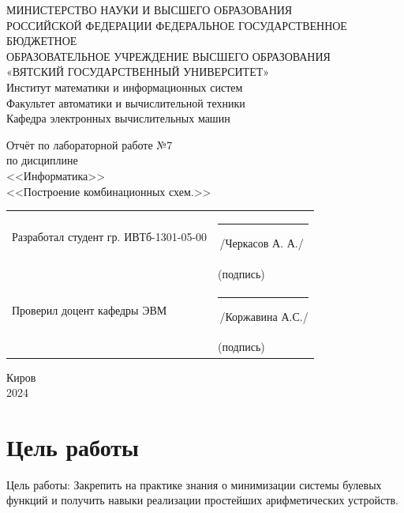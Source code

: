 \documentclass[oneside,a4paper,14pt]{extarticle}
\begin{document}
\newpage
\thispagestyle{empty}
\begin{center}
	МИНИСТЕРСТВО НАУКИ И ВЫСШЕГО ОБРАЗОВАНИЯ\\
	РОССИЙСКОЙ ФЕДЕРАЦИИ
	ФЕДЕРАЛЬНОЕ ГОСУДАРСТВЕННОЕ БЮДЖЕТНОЕ\\
	ОБРАЗОВАТЕЛЬНОЕ
	УЧРЕЖДЕНИЕ ВЫСШЕГО ОБРАЗОВАНИЯ\\
	«ВЯТСКИЙ ГОСУДАРСТВЕННЫЙ УНИВЕРСИТЕТ»\\
	Институт математики и информационных систем\\
	Факультет автоматики и вычислительной техники\\
	Кафедра электронных вычислительных машин
\end{center}
\vspace{20mm}

\begin{center}
	Отчёт по лабораторной работе №7\\
	по дисциплине\\
	<<Информатика>>\\
	<<Построение комбинационных схем.>>\\
\end{center}
\vspace{40mm}
\noindent
\begin{tabular}{ll}
	Разработал студент гр. ИВТб-1301-05-00 & \rule[-1mm]{30mm}{0.10mm}\,/Черкасов А. А./ \\
	                                       & \hspace{8mm}\footnotesize(подпись)          \\

	Проверил доцент кафедры ЭВМ            & \rule[-1mm]{30mm}{0.10mm}\,/Коржавина А.С./ \\
	                                       & \hspace{8mm}\footnotesize(подпись)          \\
\end{tabular}

\vfill
\begin{center}
	Киров\\
	2024
\end{center}

\newpage\thispagestyle{plain}
\section*{Цель работы}
Цель работы: Закрепить на практике знания о минимизации системы булевых функций
и получить навыки реализации простейших арифметических устройств.
\end{document}
